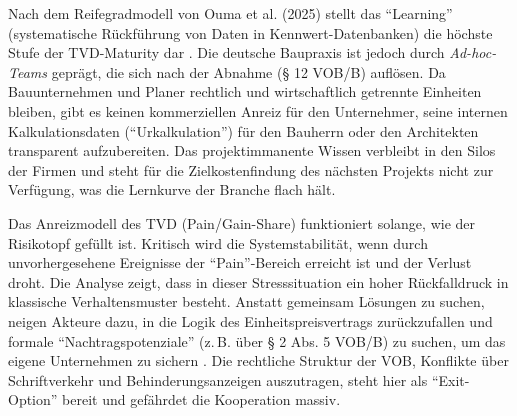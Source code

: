 Nach dem Reifegradmodell von Ouma et al. (2025) stellt das \enquote{Learning} (systematische Rückführung von Daten in Kennwert-Datenbanken) die höchste Stufe der \acs{TVD}-Maturity dar \autocite[Vgl.][S.~207]{ouma_target_2025}.
Die deutsche Baupraxis ist jedoch durch \textit{Ad-hoc-Teams} geprägt, die sich nach der Abnahme (§ 12 \acs{VOB}/B) auflösen. Da Bauunternehmen und Planer rechtlich und wirtschaftlich getrennte Einheiten bleiben, gibt es keinen kommerziellen Anreiz für den Unternehmer, seine internen Kalkulationsdaten (\enquote{Urkalkulation}) für den Bauherrn oder den Architekten transparent aufzubereiten. Das projektimmanente Wissen verbleibt in den Silos der Firmen und steht für die Zielkostenfindung des nächsten Projekts nicht zur Verfügung, was die Lernkurve der Branche flach hält.\autocite[Vgl.][§~12]{vobb_din_2016}

Das Anreizmodell des \acs{TVD} (Pain/Gain-Share) funktioniert solange, wie der Risikotopf gefüllt ist. Kritisch wird die Systemstabilität, wenn durch unvorhergesehene Ereignisse der \enquote{Pain}-Bereich erreicht ist und der Verlust droht.
Die Analyse zeigt, dass in dieser Stresssituation ein hoher Rückfalldruck in klassische Verhaltensmuster besteht. Anstatt gemeinsam Lösungen zu suchen, neigen Akteure dazu, in die Logik des Einheitspreisvertrags zurückzufallen und formale \enquote{Nachtragspotenziale} (z.\,B. über § 2 Abs. 5 \acs{VOB}/B) zu suchen, um das eigene Unternehmen zu sichern \autocite[Vgl.][S.~395]{zimina_target_2012}. Die rechtliche Struktur der \acs{VOB}, Konflikte über Schriftverkehr und Behinderungsanzeigen auszutragen, steht hier als \enquote{Exit-Option} bereit und gefährdet die Kooperation massiv.

\clearpage